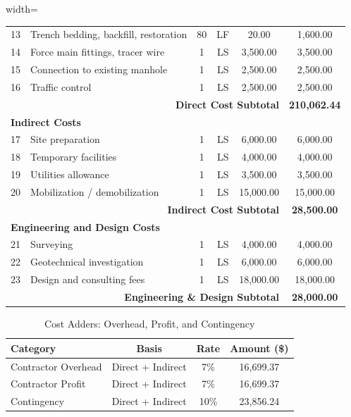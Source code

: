 \documentclass[letterpaper,12pt]{report} %
\begin{document}
\begin{table}[H]
\begin{adjustbox}{width=\textwidth}
\begin{tabular}{c l c c c c}
13 & Trench bedding, backfill, restoration & 80 & LF & 20.00 & 1,600.00 \\
14 & Force main fittings, tracer wire & 1 & LS & 3,500.00 & 3,500.00 \\
15 & Connection to existing manhole & 1 & LS & 2,500.00 & 2,500.00 \\
16 & Traffic control & 1 & LS & 2,500.00 & 2,500.00 \\
\midrule
\multicolumn{5}{r}{\textbf{Direct Cost Subtotal}} & \textbf{210,062.44} \\
\midrule
\multicolumn{6}{l}{\textbf{Indirect Costs}} \\
\midrule
17 & Site preparation & 1 & LS & 6,000.00 & 6,000.00 \\
18 & Temporary facilities & 1 & LS & 4,000.00 & 4,000.00 \\
19 & Utilities allowance & 1 & LS & 3,500.00 & 3,500.00 \\
20 & Mobilization / demobilization & 1 & LS & 15,000.00 & 15,000.00 \\
\midrule
\multicolumn{5}{r}{\textbf{Indirect Cost Subtotal}} & \textbf{28,500.00} \\
\midrule
\multicolumn{6}{l}{\textbf{Engineering and Design Costs}} \\
\midrule
21 & Surveying & 1 & LS & 4,000.00 & 4,000.00 \\
22 & Geotechnical investigation & 1 & LS & 6,000.00 & 6,000.00 \\
23 & Design and consulting fees & 1 & LS & 18,000.00 & 18,000.00 \\
\midrule
\multicolumn{5}{r}{\textbf{Engineering \& Design Subtotal}} & \textbf{28,000.00} \\
\bottomrule
\end{tabular}
\end{adjustbox}
\end{table}

\begin{table}[H]
\centering
\caption{Cost Adders: Overhead, Profit, and Contingency}
\label{tab:appendix_adders}
\begin{tabular}{l c c c}
\toprule
\textbf{Category} & \textbf{Basis} & \textbf{Rate} & \textbf{Amount (\$)} \\
\midrule
Contractor Overhead & Direct + Indirect & 7\%  & 16,699.37 \\
Contractor Profit   & Direct + Indirect & 7\%  & 16,699.37 \\
Contingency         & Direct + Indirect & 10\% & 23,856.24 \\
\bottomrule
\end{tabular}
\end{table}
\end{document}
